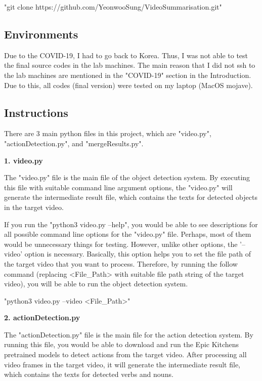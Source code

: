 \documentclass{article}
\begin{document}
"git clone https://github.com/YeonwooSung/VideoSummarisation.git"

\subsection{Environments}

Due to the COVID-19, I had to go back to Korea. Thus, I was not able to test the final source codes in the lab machines. The main reason that I did not ssh to the lab machines are mentioned in the "COVID-19" section in the Introduction. Due to this, all codes (final version) were tested on my laptop (MacOS mojave).

\subsection{Instructions}

There are 3 main python files in this project, which are "video.py", "actionDetection.py", and "mergeResults.py".\newline

\textbf{1. video.py}

The "video.py" file is the main file of the object detection system. By executing this file with suitable command line argument options, the "video.py" will generate the intermediate result file, which contains the texts for detected objects in the target video.

If you run the "python3 video.py --help", you would be able to see descriptions for all possible command line options for the "video.py" file. Perhaps, most of them would be unnecessary things for testing. However, unlike other options, the '--video' option is necessary. Basically, this option helps you to set the file path of the target video that you want to process. Therefore, by running the follow command (replacing <File\_Path> with suitable file path string of the target video), you will be able to run the object detection system.\newline

"python3 video.py --video <File\_Path>"\newline

\textbf{2. actionDetection.py}

The "actionDetection.py" file is the main file for the action detection system. By running this file, you would be able to download and run the Epic Kitchens pretrained models to detect actions from the target video. After processing all video frames in the target video, it will generate the intermediate result file, which contains the texts for detected verbs and nouns.
\end{document}
